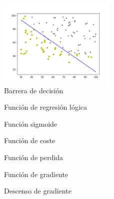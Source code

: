 \documentclass[6pt]{../../shared/AiTex}
\begin{document}
\begin{figure}[H]
    \centering
    \includegraphics[width=0.5\textwidth]{./imagenes/muestreo1_sim.png}
    \caption{Barrera de decisión}
    \label{fig:decision_boundary1}
\end{figure}

\begin{figure}[H]
    \centering
    
    \caption{Función de regresión lógica}
    \label{fig:function}
\end{figure}

\begin{figure}[H]
    \centering
    
    \caption{Función sigmoide}
    \label{fig:sigmoid}
\end{figure}

\begin{figure}[H]
    \centering
    
    \caption{Función de coste}
    \label{fig:cost}
\end{figure}

\begin{figure}[H]
    \centering
    
    \caption{Función de perdida}
    \label{fig:loss}
\end{figure}

\begin{figure}[H]
    \centering
    
    \caption{Función de gradiente}
    \label{fig:grad}
\end{figure}

\begin{figure}[H]
    \centering
    
    \caption{Descenso de gradiente}
    \label{fig:gradient_descent}
\end{figure}
\end{document}
